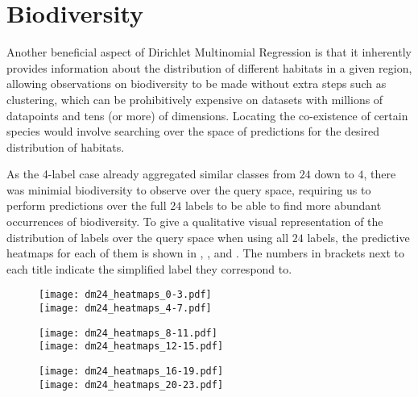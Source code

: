 \pagebreak
\section{Biodiversity}

Another beneficial aspect of Dirichlet Multinomial Regression is that it inherently provides information about the distribution of different habitats in a given region, allowing observations on biodiversity to be made without extra steps such as clustering, which can be prohibitively expensive on datasets with millions of datapoints and tens (or more) of dimensions. Locating the co-existence of certain species would involve searching over the space of predictions for the desired distribution of habitats. 

As the 4-label case already aggregated similar classes from $24$ down to $4$, there was minimial biodiversity to observe over the query space, requiring us to perform predictions over the full $24$ labels to be able to find more abundant occurrences of biodiversity. To give a qualitative visual representation of the distribution of labels over the query space when using all $24$ labels, the predictive heatmaps for each of them is shown in , , and . The numbers in brackets next to each title indicate the simplified label they correspond to.

\begin{figure}
    \texttt{[image: dm24\_heatmaps\_0-3.pdf]}\\
    \texttt{[image: dm24\_heatmaps\_4-7.pdf]}
    \caption{}
    \label{fig:dm24_0-7}
\end{figure}

\begin{figure}
    \texttt{[image: dm24\_heatmaps\_8-11.pdf]}\\
    \texttt{[image: dm24\_heatmaps\_12-15.pdf]}
    \caption{}
    \label{fig:dm24_8-15}
\end{figure}

\begin{figure}
    \texttt{[image: dm24\_heatmaps\_16-19.pdf]}\\
    \texttt{[image: dm24\_heatmaps\_20-23.pdf]}
    \caption{}
    \label{fig:dm24_16-23}
\end{figure}

